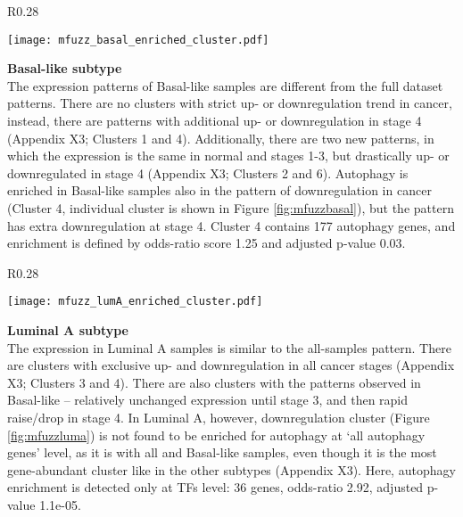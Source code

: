         
        \begin{wrapfigure}{R}{0.28\textwidth}
        \hfill
        \captionsetup{justification=centering}
        \centerline{ \texttt{[image: mfuzz\_basal\_enriched\_cluster.pdf]}}
        \vspace*{-8mm}
        \caption[Basal-like subtype downregulation cluster]{\label{fig:mfuzzbasal}Basal-like\newline downregulation cluster}
        \end{wrapfigure}

        
        \textbf{Basal-like subtype}\\
        The expression patterns of Basal-like samples are different from the full dataset patterns. There are no clusters with strict up- or downregulation trend in cancer, instead, there are patterns with additional up- or downregulation in stage 4 (Appendix X3; Clusters 1 and 4). Additionally, there are two new patterns, in which the expression is the same in normal and stages 1-3, but drastically up- or downregulated in stage 4 (Appendix X3; Clusters 2 and 6).  
        Autophagy is enriched in Basal-like samples also in the pattern of downregulation in cancer (Cluster 4, individual cluster is shown in Figure \ref{fig:mfuzzbasal}), but the pattern has extra downregulation at stage 4. Cluster 4 contains 177 autophagy genes, and enrichment is defined by odds-ratio score 1.25 and adjusted p-value 0.03. 
        
        
        \begin{wrapfigure}{R}{0.28\textwidth}
        \hfill
        \captionsetup{justification=centering}
        \centerline{ \texttt{[image: mfuzz\_lumA\_enriched\_cluster.pdf]}}
        \vspace*{-8mm}
        \caption[Luminal A subtype downregulation cluster]{\label{fig:mfuzzluma}Luminal A \newline downregulation cluster}
        \end{wrapfigure}
        
        
        \textbf{Luminal A subtype}\\   
        The expression in Luminal A samples is similar to the all-samples pattern. There are clusters with exclusive up- and downregulation in all cancer stages (Appendix X3; Clusters 3 and 4). There are also clusters with the patterns observed in Basal-like -- relatively unchanged expression until stage 3, and then rapid raise/drop in stage 4. In Luminal A, however, downregulation cluster (Figure \ref{fig:mfuzzluma}) is not found to be enriched for autophagy at ‘all autophagy genes' level, as it is with all and Basal-like samples, even though it is the most gene-abundant cluster like in the other subtypes (Appendix X3). Here, autophagy enrichment is detected only at TFs level: 36 genes, odds-ratio 2.92, adjusted p-value 1.1e-05.\vspace{-5mm} \break
        
